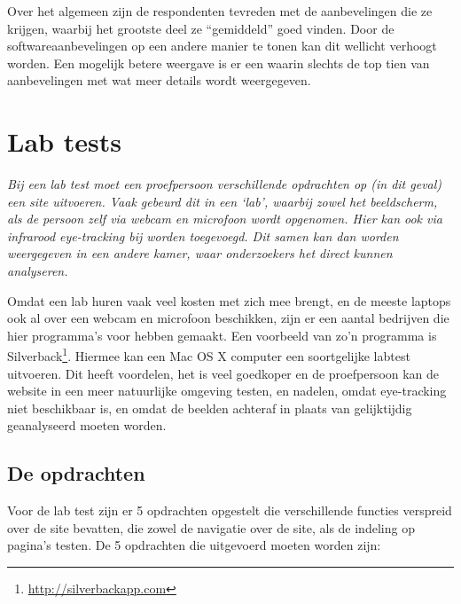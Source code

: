 \documentclass[a4paper, 10pt, pdftex]{report}
\begin{document}
    Over het algemeen zijn de respondenten tevreden met de aanbevelingen die ze krijgen, waarbij het grootste deel ze ``gemiddeld'' goed vinden. Door de softwareaanbevelingen op een andere manier te tonen kan dit wellicht verhoogt worden. Een mogelijk betere weergave is er een waarin slechts de top tien van aanbevelingen met wat meer details wordt weergegeven.

    \newpage
    \section{Lab tests}
    \textit{Bij een lab test moet een proefpersoon verschillende opdrachten op (in dit geval) een site uitvoeren. Vaak gebeurd dit in een `lab', waarbij zowel het beeldscherm, als de persoon zelf via webcam en microfoon wordt opgenomen. Hier kan ook via infrarood eye-tracking bij worden toegevoegd. Dit samen kan dan worden weergegeven in een andere kamer, waar onderzoekers het direct kunnen analyseren.}

    Omdat een lab huren vaak veel kosten met zich mee brengt, en de meeste laptops ook al over een webcam en microfoon beschikken, zijn er een aantal bedrijven die hier programma's voor hebben gemaakt. Een voorbeeld van zo'n programma is Silverback\footnote{\url{http://silverbackapp.com}}. Hiermee kan een Mac OS X computer een soortgelijke labtest uitvoeren. Dit heeft voordelen, het is veel goedkoper en de proefpersoon kan de website in een meer natuurlijke omgeving testen, en nadelen, omdat eye-tracking niet beschikbaar is, en omdat de beelden achteraf in plaats van gelijktijdig geanalyseerd moeten worden.

    \subsection{De opdrachten}
    Voor de lab test zijn er 5 opdrachten opgestelt die verschillende functies verspreid over de site bevatten, die zowel de navigatie over de site, als de indeling op pagina's testen. De 5 opdrachten die uitgevoerd moeten worden zijn:
\end{document}
